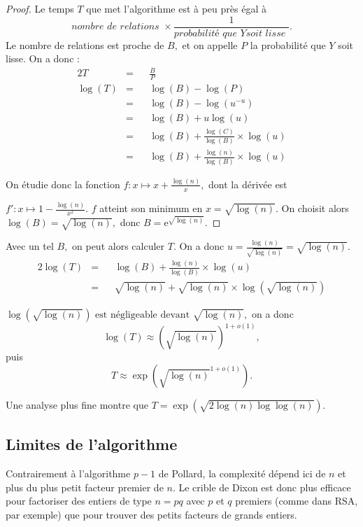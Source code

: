 \documentclass[french, 12pt, titlepage]{article}
\begin{document}
\begin{proof}

Le temps $T$ que met l'algorithme est à peu près égal à
\[\textit{nombre de relations } \times \frac{1}{\textit{probabilité que
  } Y \textit{soit lisse }}.\] Le nombre de relations est proche de $B,$ et on
appelle $P$ la probabilité que $Y$ soit lisse. On a donc : 
\begin{alignat*}{2}
T & = && \frac{B}{P} \\
\log(T) & = && \log(B) - \log(P) \\
 & = && \log(B) - \log(u^{-u}) \\
 & = && \log(B) + u\log(u) \\
 & = && \log(B) + \frac{\log(C)}{\log(B)} \times \log(u) \\
 & = && \log(B) + \frac{\log(n)}{\log(B)} \times \log(u)
\end{alignat*}     

On étudie donc la fonction $f : x \mapsto x + \frac{\log(n)}{x},$ dont
la dérivée est 

\noindent $f' : x \mapsto 1 - \frac{\log(n)}{x^2}.$ $f$ atteint
son minimum en $x = \sqrt{\log(n)}.$ On choisit alors $\log(B) = \sqrt{\log(n)},$ donc $B = \text{e}^{\sqrt{\log(n)}}.$ 
\end{proof}

Avec un tel $B,$ on peut alors calculer $T.$ On a donc $u = \frac{\log(n)}{\sqrt{\log(n)}} = \sqrt{\log(n)}.$
\begin{alignat*}{2}
\log(T) & = && \log(B) + \frac{\log(n)}{\log(B)} \times \log(u) \\
 & = && \sqrt{\log(n)} + \sqrt{\log(n)} \times \log(\sqrt{\log(n)}) 
\end{alignat*}

$\log(\sqrt{\log(n)}) \text{ est négligeable devant } \sqrt{\log(n)},$
on a donc
\[\log(T) \approx (\sqrt{\log(n)})^{1+o(1)},\] puis
\[T \approx \exp(\sqrt{\log(n)}^{1+o(1)}).\]

Une analyse plus fine montre que $T = \exp(\sqrt{2\log(n)\log\log(n)}).$

\subsection{Limites de l'algorithme}

Contrairement à l'algorithme $p - 1$ de Pollard, la complexité dépend
ici de $n$ et plus du plus petit facteur premier de $n.$ Le crible de
Dixon est donc plus efficace pour factoriser des entiers de type $n =
pq$ avec $p$ et $q$ premiers (comme dans RSA, par exemple) que pour trouver des petits facteurs de
grands entiers.
\end{document}
